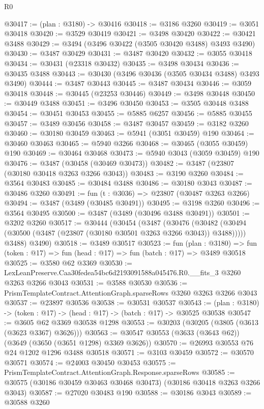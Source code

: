 \begin{lexlean}{R0}
\begin{coremodule}
@30417 := (plan : @3180) -> @30416
@30418 := @3186 @3260
@30419 := @3051 @30418
@30420 := @3529 @30419
@30421 := @3498 @30420
@30422 := @30421 @3488
@30429 := @3494 (@3496 @30422 (@3505 @30420 @3488) @3493 @3490)
@30430 := @3487 @30429
@30431 := @3487 @30420
@30432 := @3055 @30418
@30434 := @30431 (@23318 @30432)
@30435 := @3498 @30434
@30436 := @30435 @3488
@30443 := @30430 (@3496 @30436 (@3505 @30434 @3488) @3493 @3490)
@30444 := @3487 @30443
@30445 := @3487 @30434
@30446 := @3059 @30418
@30448 := @30445 (@23253 @30446)
@30449 := @3498 @30448
@30450 := @30449 @3488
@30451 := @3496 @30450
@30453 := @3505 @30448 @3488
@30454 := @30451 @30453
@30455 := @5885 @6257
@30456 := @5885 @30455
@30457 := @3489 @30456
@30458 := @3487 @30457
@30459 := @3182 @3260
@30460 := @30180 @30459
@30463 := @5941 (@3051 @30459) @190
@30464 := @30460 @30463
@30465 := @5940 @3266
@30468 := @30465 (@3055 @30459) @190
@30469 := @30464 @30468
@30473 := @5940 @3043 (@3059 @30459) @190
@30476 := @3487 (@30458 (@30469 @30473))
@30482 := @3487 (@23807 (@30180 @30418 @3263 @3266 @3043))
@30483 := @3190 @3260
@30484 := @3564 @30483
@30485 := @30484 @3488
@30486 := @30180 @3043
@30487 := @30486 @3260
@30491 := fun (t : @3036) => @23807 (@30487 @3263 @3266)
@30494 := @3487 (@3489 (@30485 @30491))
@30495 := @3198 @3260
@30496 := @3564 @30495
@30500 := @3487 (@3489 (@30496 @3488 @30491))
@30501 := @3202 @3260
@30517 := @30444
    (@30454
      (@3487
        (@30476 (@30482 (@30494 (@30500 (@3487 (@23807 (@30180 @30501 @3263 @3266 @3043)) @3488)))))
        @3488)
      @3490)
@30518 := @3489 @30517
@30523 := fun (plan : @3180) =>
  fun (token : @17) => fun (head : @17) => fun (batch : @17) => @3489 @30518
@30525 := @3580 @62 @3369
@30530 := LexLeanPreserve.Caa30fedea54bc6d2193091588a045476.R0.__fits_3 @3260 @3263 @3266 @3043
@30531 := @3588 @30530
@30536 := PrismTemplateContract.AttentionGraph.sparseRows @3260 @3263 @3266 @3043
@30537 := @23897 @30536
@30538 := @30531 @30537
@30543 := (plan : @3180) -> (token : @17) -> (head : @17) -> (batch : @17) -> @30525 @30538
@30547 := @3605 @62 @3369 @30538 @1298
@30553 := @30203 (@30205 (@3805 (@3613 (@3623 @3367) @3626)))
@30563 := @30547 @30553 (@3633 (@3643 @62)) (@3649 (@3650 (@3651 @1298) @3369 @3626))
@30570 := @26993 @30553 @76 @24 @1202 @1296 @3488 @30518
@30571 := @3103 @30459
@30572 := @30570 @30571
@30574 := @24003 @30450 @30453
@30575 := PrismTemplateContract.AttentionGraph.Response.sparseRows
@30585 := @30575 (@30186 @30459 @30463 @30468 @30473) (@30186 @30418 @3263 @3266 @3043)
@30587 := @27020 @30483 @190
@30588 := @30186 @3043
@30589 := @30588 @3260

\end{coremodule}
\end{lexlean}
